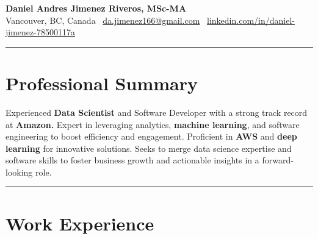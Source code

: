 \documentclass[10pt,a4paper]{article}
\begin{document}
\titlespacing*{\section}{0pt}{0pt}{10pt} 
\titlespacing*{\subsection}{0pt}{10pt}{5pt} 
\titlespacing*{\section}{0pt}{0pt}{4pt}


\pagestyle{empty}

{
\centering
{\Huge\textbf{Daniel Andres Jimenez Riveros, MSc-MA}}\\
\medskip 
Vancouver, BC, Canada \textbar\ \href{mailto:da.jimenez166@gmail.com}{da.jimenez166@gmail.com} \textbar\ \href{https://www.linkedin.com/in/daniel-jimenez-78500117a/}{linkedin.com/in/daniel-jimenez-78500117a}\\
}

\rule{\textwidth}{0.4pt} 

\section*{Professional Summary}

Experienced \textbf{Data Scientist} and Software Developer with a strong track record at \textbf{Amazon.} Expert in leveraging analytics, \textbf{machine learning}, and software engineering to boost efficiency and engagement. Proficient in \textbf{AWS} and \textbf{deep learning} for innovative solutions. Seeks to merge data science expertise and software skills to foster business growth and actionable insights in a forward-looking role.

\rule{\textwidth}{0.4pt} 

\section*{Work Experience}
\end{document}
